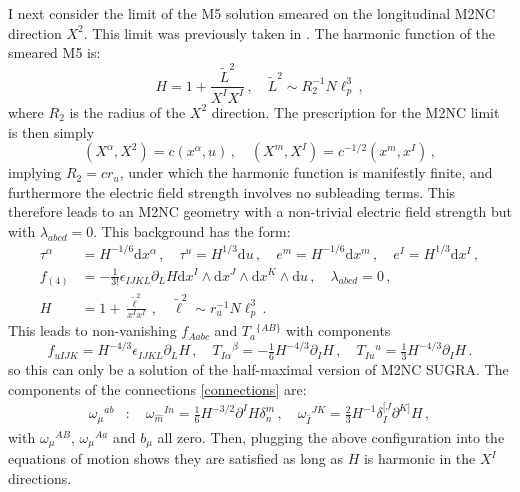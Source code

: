 \documentclass[11pt]{article}
\newcommand{\be}{\begin{equation}}
\newcommand{\ee}{\end{equation}}
\newcommand{\dd}{\mathrm{d}}
\numberwithin{equation}{section}
\begin{document}
{{I next consider the limit of the M5 solution smeared on the longitudinal M2NC direction $X^2$.
This limit was previously taken in \cite{Lambert:2024ncn}.
The harmonic function of the smeared M5 is:
\be
H = 1 + \frac{\tilde L^2}{X^IX^I} \,,\quad \tilde L^2 \sim R_2^{-1} N \ell_p^3 \,,
\ee
where $R_2$ is the radius of the $X^2$ direction.
The prescription for the M2NC limit is then simply
\be
(X^\alpha, X^2) = c (x^\alpha, u) \,,\quad
(X^m, X^I) = c^{-1/2} (x^m, x^I) \,,
\ee
implying $R_2 = c r_u$,
under which the harmonic function is manifestly finite, and furthermore the electric field strength involves no subleading terms.
This therefore leads to an M2NC geometry with a non-trivial electric field strength but with $\lambda_{abcd} = 0$.
This background has the form:
\be
\begin{split} 
\tau^\alpha & = H^{-1/6} \dd x^\alpha \,,\quad \tau^u= H^{1/3} \dd u \,,\quad
e^m = H^{-1/6} \dd x^m \,,\quad e^I = H^{1/3} \dd x^I \,,\\[4pt]
f_{(4)} & = - \tfrac{1}{3!} \epsilon_{IJKL} \partial_L H \dd x^I \wedge \dd x^J \wedge \dd x^K \wedge \dd u \,,\quad 
\lambda_{abcd} = 0 \,,\\[4pt]
H & = 1 + \frac{\tilde \ell^2}{x^Ix^I}\,,\quad \tilde \ell^2 \sim  r_u^{-1} N \ell_p^3 \,.
\end{split} 
\ee
This leads to non-vanishing $f_{Aabc}$ and $T_{a}{}^{\{AB\}}$ with components 
\be
f_{u IJK} = H^{-4/3} \epsilon_{IJKL} \partial_L H \,,\quad
T_{I\alpha}{}^\beta = -\tfrac16 H^{-4/3} \partial_I H \,,\quad
T_{Iu}{}^u = \tfrac13 H^{-4/3} \partial_I H  \,.
\ee
so this can only be a solution of the half-maximal version of M2NC SUGRA.
The components of the connections \eqref{connections} are:
\begin{align} 
\omega_{\mu}{}^{ab} & : \quad \omega_{\hat m}{}^{I n} = \tfrac16 H^{-3/2}\partial^I H \delta_n^m \,,\quad \omega_{\hat I}{}^{JK} = \tfrac23 H^{-1} \delta_I^{[J} \partial^{K]} H \,,
\end{align} 
with $\omega_{\mu}{}^{AB}$, $\omega_{\mu}{}^{Aa}$ and $b_\mu$ all zero.
Then, plugging the above configuration into the equations of motion shows they are satisfied as long as $H$ is harmonic in the $X^I$ directions.

}}
\end{document}

